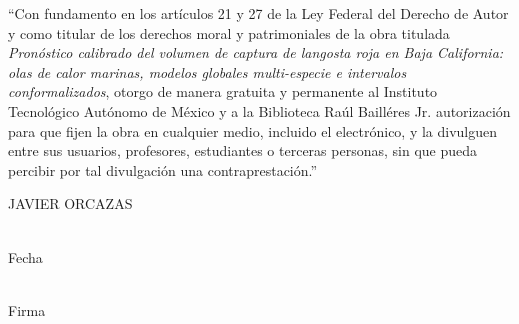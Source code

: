 \thispagestyle{empty}
\vspace*{4cm}
\noindent
``Con fundamento en los artículos 21 y 27 de la Ley Federal del Derecho de Autor y como
titular de los derechos moral y patrimoniales de la obra titulada \emph{Pronóstico
calibrado del volumen de captura de langosta roja en Baja California: olas de calor
marinas, modelos globales multi-especie e intervalos conformalizados}, otorgo de manera
gratuita y permanente al Instituto Tecnológico Autónomo de México y a la Biblioteca Raúl
Bailléres Jr. autorización para que fijen la obra en cualquier medio, incluido el
electrónico, y la divulguen entre sus usuarios, profesores, estudiantes o terceras
personas, sin que pueda percibir por tal divulgación una contraprestación.''

\vspace{3cm}
\begin{center}
JAVIER ORCAZAS

\vspace{2cm}
\underline{\hspace{7cm}}\\
Fecha

\vspace{2cm}
\underline{\hspace{7cm}}\\
Firma
\end{center}
\cleardoublepage
